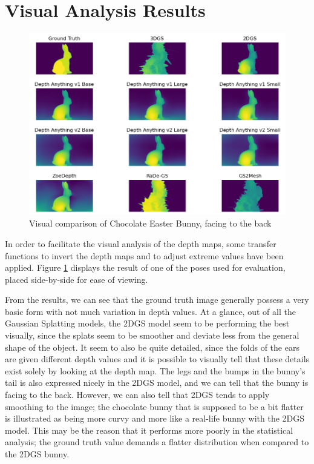 \section{Visual Analysis Results}

\begin{figure}[h]
    \centering
    \includegraphics[width=1.0\linewidth]{figures/visual-comparison-1.png}
    \caption{Visual comparison of Chocolate Easter Bunny, facing to the back}
    \label{fig:visual-analysis-1}
\end{figure}

In order to facilitate the visual analysis of the depth maps, some transfer functions to invert the depth maps and to adjust extreme values have been applied. Figure \ref{fig:visual-analysis-1} displays the result of one of the poses used for evaluation, placed side-by-side for ease of viewing.

From the results, we can see that the ground truth image generally possess a very basic form with not much variation in depth values. At a glance, out of all the Gaussian Splatting models, the 2DGS model seem to be performing the best visually, since the splats seem to be smoother and deviate less from the general shape of the object. It seem to also be quite detailed, since the folds of the ears are given different depth values and it is possible to visually tell that these details exist solely by looking at the depth map. The legs and the bumps in the bunny's tail is also expressed nicely in the 2DGS model, and we can tell that the bunny is facing to the back. However, we can also tell that 2DGS tends to apply smoothing to the image; the chocolate bunny that is supposed to be a bit flatter is illustrated as being more curvy and more like a real-life bunny with the 2DGS model. This may be the reason that it performs more poorly in the statistical analysis; the ground truth value demands a flatter distribution when compared to the 2DGS bunny.

